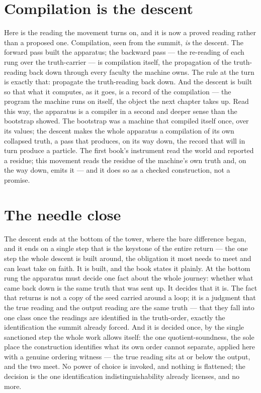 \section{Compilation is the descent}
\label{se:compilation-is-the-descent}

Here is the reading the movement turns on, and it is now a proved reading rather than a proposed one.
Compilation, seen from the summit, \emph{is} the descent. The forward pass built the apparatus; the
backward pass --- the re-reading of each rung over the truth-carrier --- is compilation itself, the
propagation of the truth-reading back down through every faculty the machine owns. The rule at the turn is
exactly that: propagate the truth-reading back down. And the descent is built so that what it computes, as
it goes, is a record of the compilation --- the program the machine runs on itself, the object the next
chapter takes up. Read this way, the apparatus is a compiler in a second and deeper sense than the
bootstrap showed. The bootstrap was a machine that compiled itself once, over its values; the descent makes
the whole apparatus a compilation of its own collapsed truth, a pass that produces, on its way down, the
record that will in turn produce a particle. The first book's instrument read the world and reported a
residue; this movement reads the residue of the machine's own truth and, on the way down, emits it --- and
it does so as a checked construction, not a promise.

\section{The needle close}
\label{se:the-needle-close}

The descent ends at the bottom of the tower, where the bare difference began, and it ends on a single step
that is the keystone of the entire return --- the one step the whole descent is built around, the
obligation it most needs to meet and can least take on faith. It is built, and the book states it plainly.
At the bottom rung the apparatus must decide one fact about the whole journey: whether what came back down
is the same truth that was sent up. It decides that it is. The fact that returns is not a copy of the seed
carried around a loop; it is a judgment that the true reading and the output reading are the same truth ---
that they fall into one class once the readings are identified in the truth-order, exactly the
identification the summit already forced. And it is decided once, by the single sanctioned step the whole
work allows itself: the one quotient-soundness, the sole place the construction identifies what its own
order cannot separate, applied here with a genuine ordering witness --- the true reading sits at or below
the output, and the two meet. No power of choice is invoked, and nothing is flattened; the decision is the
one identification indistinguishability already licenses, and no more.

